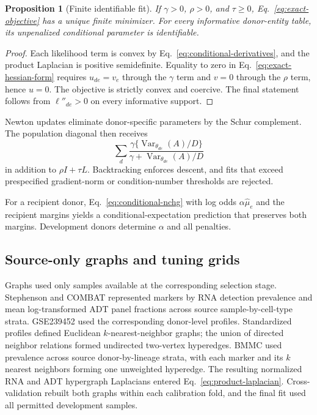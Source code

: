 \documentclass[10pt,a4paper]{article}
\newtheorem{proposition}{Proposition}
\begin{document}
\begin{proposition}[Finite identifiable fit]
If $\gamma>0$, $\rho>0$, and $\tau\ge0$, Eq.~\eqref{eq:exact-objective} has a unique finite minimizer. For every informative donor-entity table, its unpenalized conditional parameter is identifiable.
\end{proposition}

\begin{proof}
Each likelihood term is convex by Eq.~\eqref{eq:conditional-derivatives}, and the product Laplacian is positive semidefinite. Equality to zero in Eq.~\eqref{eq:exact-hessian-form} requires $u_{de}=v_e$ through the $\gamma$ term and $v=0$ through the $\rho$ term, hence $u=0$. The objective is strictly convex and coercive. The final statement follows from $\ell''_{de}>0$ on every informative support.
\end{proof}

Newton updates eliminate donor-specific parameters by the Schur complement. The population diagonal then receives
\[
 \sum_d\frac{\gamma\{\operatorname{Var}_{\theta_{de}}(A)/D\}}
 {\gamma+\operatorname{Var}_{\theta_{de}}(A)/D}
\]
in addition to $\rho I+\tau L$. Backtracking enforces descent, and fits that exceed prespecified gradient-norm or condition-number thresholds are rejected.

For a recipient donor, Eq.~\eqref{eq:conditional-nchg} with log odds $\alpha\widehat\mu_e$ and the recipient margins yields a conditional-expectation prediction that preserves both margins. Development donors determine $\alpha$ and all penalties.

\subsection{Source-only graphs and tuning grids}

Graphs used only samples available at the corresponding selection stage. Stephenson and COMBAT represented markers by RNA detection prevalence and mean log-transformed ADT panel fractions across source sample-by-cell-type strata. GSE239452 used the corresponding donor-level profiles. Standardized profiles defined Euclidean $k$-nearest-neighbor graphs; the union of directed neighbor relations formed undirected two-vertex hyperedges. BMMC used prevalence across source donor-by-lineage strata, with each marker and its $k$ nearest neighbors forming one unweighted hyperedge. The resulting normalized RNA and ADT hypergraph Laplacians entered Eq.~\eqref{eq:product-laplacian}. Cross-validation rebuilt both graphs within each calibration fold, and the final fit used all permitted development samples.
\end{document}
